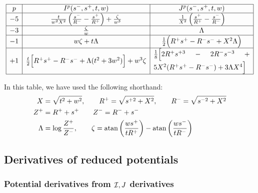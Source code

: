 \documentclass[letterpaper]{article}
\begin{document}
$$\begin{array}{|c|c|c|}\hline
p 
& 
I^p(s^-, s^+, t, w)
&
J^p(s^-, s^+, t, w)
\\\hline
-5 
&
\frac{t}{w^2 X^2}\left( \frac{s^-}{R^-} - \frac{s^+}{R^+} \right)
+\frac{\zeta}{w^3} 
&
\frac{1}{X^2}\left( \frac{s^+}{R^+} - \frac{s^-}{R^-} \right)
\\\hline
-3 
&
\frac{\zeta}{w}
&
\Lambda
\\\hline
-1 
&
w\zeta + t\Lambda
&
\frac{1}{2}\Big(R^+ s^+ - R^- s^- + X^2 \Lambda\Big)
\\\hline
+1 
&
\frac{t}{2}\Big[R^+ s^+ - R^- s^- + \Lambda(t^2 + 3w^2)\Big]
 + w^3 \zeta
&
\parbox{0.4\textwidth}{$
\frac{1}{8}\Big[2R^+ s^{+3} - 2R^- s^{-3} + 5X^2(R^+ s^+ - R^- s^-)
 + 3\Lambda X^4\Big]$}
\\\hline
\end{array}$$

In this table, we have used the following shorthand:
\begin{align*}
 X&=\sqrt{t^2 + w^2},
 \qquad
 R^+=\sqrt{s^{+2} + X^2},
 \qquad
 R^-=\sqrt{s^{-2} + X^2}
\\
 Z^+ &= R^+ + s^+ 
\qquad 
 Z^- = R^- + s^-
\\
 \Lambda &= \log\frac{Z^+}{Z^-}, \qquad 
 \zeta   = \text{atan}\left(\frac{w s^+}{tR^+}\right) - \text{atan}\left(\frac{w s^-}{tR^-}\right)
\end{align*}

\subsection{Derivatives of reduced potentials}

\subsubsection{Potential derivatives from $\mathcal{I},J$ derivatives}
\end{document}
